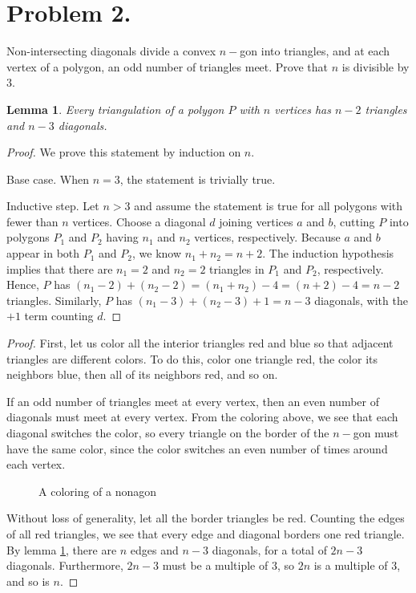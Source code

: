 \documentclass{article}
\newtheorem{lemma}[theorem]{Lemma}
\begin{document}
\section{Problem 2.}
Non-intersecting diagonals divide a convex $n-$gon into triangles, and at each vertex of a polygon, an odd number of triangles meet. Prove that $n$ is divisible by $3$.
\begin{lemma}\label{2.1}
Every triangulation of a polygon $P$ with $n$ vertices has $n-2$ triangles and $n-3$ diagonals.
\end{lemma}
\begin{proof}
We prove this statement by induction on $n$. 
\par Base case. When $n=3$, the statement is trivially true.
\par Inductive step. Let $n>3$ and assume the statement is true for all polygons with fewer than $n$ vertices. Choose a diagonal $d$ joining vertices $a$ and $b$, cutting $P$ into polygons $P_1$ and $P_2$ having $n_1$ and $n_2$ vertices, respectively. Because $a$ and $b$ appear in both $P_1$ and $P_2$, we know $n_1+n_2=n+2$. The induction hypothesis implies that there are $n_1=2$ and $n_2=2$ triangles in $P_1$ and $P_2$, respectively. Hence, $P$ has $(n_1-2)+(n_2-2)=(n_1+n_2)-4=(n+2)-4=n-2$ triangles. Similarly, $P$ has $(n_1-3)+(n_2-3)+1=n-3$ diagonals, with the $+1$ term counting $d$.
\end{proof}
\begin{proof}
First, let us color all the interior triangles red and blue so that adjacent triangles are different colors. To do this, color one triangle red, the color its neighbors blue, then all of its neighbors red, and so on. 
\par If an odd number of triangles meet at every vertex, then an even number of diagonals must meet at every vertex. From the coloring above, we see that each diagonal switches the color, so every triangle on the border of the $n-$gon must have the same color, since the color switches an even number of times around each vertex. 

\begin{figure}[ht]
    \centering
    
    \caption{A coloring of a nonagon}
\end{figure}

\par Without loss of generality, let all the border triangles be red. Counting the edges of all red triangles, we see that every edge and diagonal borders one red triangle. By lemma \ref{2.1}, there are $n$ edges and $n-3$ diagonals, for a total of $2n-3$ diagonals. Furthermore, $2n-3$ must be a multiple of $3$, so $2n$ is a multiple of $3$, and so is $n$.
\end{proof}
\end{document}
